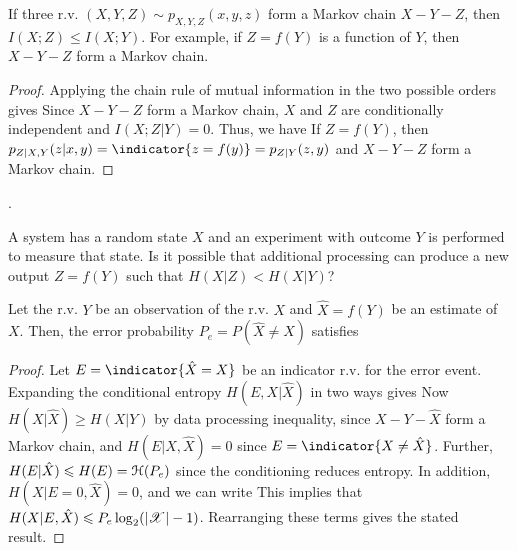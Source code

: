 \documentclass[letterpaper,10pt,english]{article}
\begin{document}
\begin{thm} 
If three r.v. $(X, Y, Z) \sim p_{X,Y,Z} (x, y, z)$ form a Markov chain $X - Y- Z$, then 
$I(X;Z) \le I(X;Y)$. 
For example, if $Z=f(Y)$ is a function of $Y$, 
then $X -Y - Z$ form a Markov chain. 
\end{thm} 
\begin{proof}
Applying the chain rule of mutual information in the two possible orders gives 
Since $X - Y - Z$ form a Markov chain, $X$ and $Z$ are conditionally independent and 
$I(X;Z|Y) = 0$. 
Thus, we have 
If $Z = f(Y)$, then $p_{Z|X,Y}(z|x,y) = \indicator{z =f(y)} = p_{Z|Y}(z,y)$ and $X - Y - Z$ form a Markov chain.
\end{proof}. 
\begin{exmp}
A system has a random state $X$ and an experiment with outcome $Y$ is performed to measure that state. 
Is it possible that additional processing can produce a new output $Z = f(Y)$ such that 
$H (X|Z) < H (X|Y )$?
\end{exmp}
\begin{thm}  
Let the r.v. $Y$ be an observation of the r.v. $X$ and $\hat{X} = f(Y)$ be an estimate of $X$. 
Then, the error probability $P_e = P(\hat{X} \neq X)$ satisfies 
\end{thm} 
\begin{proof}
Let $E = \indicator{\hat{X}= X}$ be an indicator r.v. for the error event. 
Expanding the conditional entropy $H(E, X |\hat{X})$ in two ways gives 
Now $H(X|\hat{X}) \ge H(X|Y)$ by data processing inequality, since $X - Y - \hat{X}$ form a Markov chain, 
and $H(E| X, \hat{X}) = 0$ since $E = \indicator{X \neq \hat{X}}$. 
Further, $H(E|\hat{X}) \leqslant H(E) = \mathcal{H}(P_e)$ since the conditioning reduces entropy. 
In addition, $H(X|E=0, \hat{X}) = 0$, and we can write 
This implies that $H(X|E, \hat{X}) \leqslant P_e\log_2(\left\lvert\mathscr{X}\right\rvert-1)$. 
Rearranging these terms gives the stated result.
\end{proof}
\end{document}

